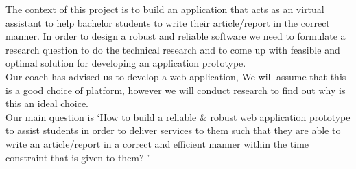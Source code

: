 The context of this project is to build an application that acts as an virtual assistant to help bachelor students to write their article/report in the correct manner. In order to design a robust and reliable software we need to formulate a research question to do the technical research and to come up with feasible and optimal solution for developing an application prototype.\\

Our coach has advised us to develop a web application, We will assume that this is a good choice of platform, however we will conduct research to find out why is this an ideal choice. \\

Our main question is `How to build a reliable \& robust web application prototype to assist students in order to deliver services to them such that they are able to write an article/report in a correct and efficient manner within the time constraint that is given to them? '


